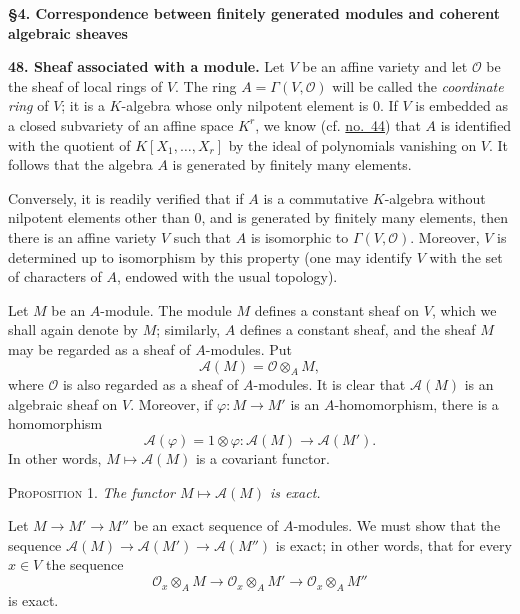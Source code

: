
\medskip
{}\label{fac:II:4}
\textbf{§4. Correspondence between finitely generated modules and coherent algebraic sheaves}

\label{fac:II:4:no:48}
\textbf{48. Sheaf associated with a module.}
Let $V$ be an affine variety and let $\mathcal{O}$ be the sheaf of local rings
\label{fac:II:4:no:48:def:coordinate-ring}
of $V$. The ring $A=\Gamma(V,\mathcal{O})$ will be called the
\textit{coordinate ring} of $V$; it is a $K$-algebra whose only nilpotent
element is $0$. If $V$ is embedded as a closed subvariety of an affine space
$K^r$, we know (cf. \hyperref[fac:II:3:no:44]{no.~44}) that $A$ is identified with the quotient of
$K[X_1,\ldots,X_r]$ by the ideal of polynomials vanishing on $V$. It follows
that the algebra $A$ is generated by finitely many elements.

Conversely, it is readily verified that if $A$ is a commutative $K$-algebra
without nilpotent elements other than $0$, and is generated by finitely many
elements, then there is an affine variety $V$ such that $A$ is isomorphic to
$\Gamma(V,\mathcal{O})$. Moreover, $V$ is determined up to isomorphism by
this property (one may identify $V$ with the set of characters of $A$,
endowed with the usual topology).

\label{fac:II:4:no:48:construction:A-M}
Let $M$ be an $A$-module. The module $M$ defines a constant sheaf on $V$,
which we shall again denote by $M$; similarly, $A$ defines a constant sheaf,
and the sheaf $M$ may be regarded as a sheaf of $A$-modules. Put
\[
\mathcal{A}(M)=\mathcal{O}\otimes_A M,
\]
where $\mathcal{O}$ is also regarded as a sheaf of $A$-modules. It is clear
that $\mathcal{A}(M)$ is an algebraic sheaf on $V$. Moreover, if
$\varphi:M\to M'$ is an $A$-homomorphism, there is a homomorphism
\[
\mathcal{A}(\varphi)=1\otimes\varphi:
\mathcal{A}(M)\longrightarrow\mathcal{A}(M').
\]
In other words, $M\mapsto\mathcal{A}(M)$ is a covariant functor.

\label{fac:II:4:prop:1}
\textsc{Proposition 1.} \textit{The functor
$M\mapsto\mathcal{A}(M)$ is exact.}

Let $M\to M'\to M''$ be an exact sequence of $A$-modules. We must show that
the sequence
$\mathcal{A}(M)\to\mathcal{A}(M')\to\mathcal{A}(M'')$ is exact; in other
words, that for every $x\in V$ the sequence
\[
\mathcal{O}_x\otimes_A M
\longrightarrow\mathcal{O}_x\otimes_A M'
\longrightarrow\mathcal{O}_x\otimes_A M''
\]
is exact.

